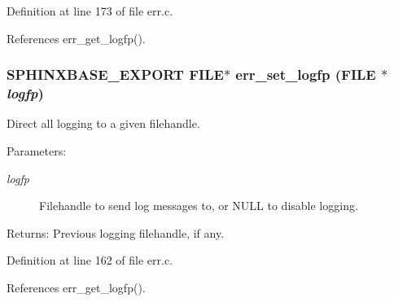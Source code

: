Definition at line 173 of file err.c.

References err\_\-get\_\-logfp().
\subsubsection[{err\_\-set\_\-logfp}]{\setlength{\rightskip}{0pt plus 5cm}SPHINXBASE\_\-EXPORT FILE$\ast$ err\_\-set\_\-logfp (FILE $\ast$ {\em logfp})}\label{err_8h_8bac37b001e58048b9f52ea1c756fc08}


Direct all logging to a given filehandle. 

\begin{Desc}
\item[Parameters:]
\begin{description}
\item[{\em logfp}]Filehandle to send log messages to, or NULL to disable logging. \end{description}
\end{Desc}
\begin{Desc}
\item[Returns:]Previous logging filehandle, if any. \end{Desc}


Definition at line 162 of file err.c.

References err\_\-get\_\-logfp().